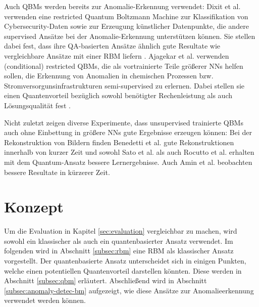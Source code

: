 Auch QBMs werden bereits zur Anomalie-Erkennung verwendet: Dixit et al. \cite{dixit2021training} verwenden eine restricted Quantum Boltzmann Machine zur Klassifikation von Cybersecurity-Daten sowie zur Erzeugung künstlicher Datenpunkte, die andere supervised Ansätze bei der Anomalie-Erkennung unterstützen können. Sie stellen dabei fest, dass ihre QA-basierten Ansätze ähnlich gute Resultate wie vergleichbare Ansätze mit einer RBM liefern \cite{dixit2021training}. Ajagekar et al. \cite{ajagekar2020quantum, ajagekar2021quantum} verwenden (conditional) restricted QBMs, die als vortrainierte Teile größerer NNs helfen sollen, die Erkennung von Anomalien in chemischen Prozessen \cite{ajagekar2020quantum} bzw. Stromversorgunsinfrastrukturen \cite{ajagekar2021quantum} semi-supervised zu erlernen. Dabei stellen sie einen Quantenvorteil bezüglich sowohl benötigter Rechenleistung als auch Lösungsqualität fest \cite{ajagekar2021quantum}.

Nicht zuletzt zeigen diverse Experimente, dass unsupervised trainierte QBMs auch ohne Einbettung in größere NNs gute Ergebnisse erzeugen können: Bei der Rekonstruktion von Bildern finden Benedetti et al. \cite{Benedetti17} gute Rekonstruktionen innerhalb von kurzer Zeit und sowohl Sato et al. \cite{sato2021assessment} als auch Rocutto et al. \cite{rocutto2021quantum} erhalten mit dem Quantum-Ansatz bessere Lernergebnisse. Auch Amin et al. \cite{Amin18} beobachten bessere Resultate in kürzerer Zeit.


\section{Konzept}
\label{sec:concept}
Um die Evaluation in Kapitel \ref{sec:evaluation} vergleichbar zu machen, wird sowohl ein klassischer als auch ein quantenbasierter Ansatz verwendet. Im folgenden wird in Abschnitt \ref{subsec:rbm} eine RBM als klassischer Ansatz vorgestellt. Der quantenbasierte Ansatz unterscheidet sich in einigen Punkten, welche einen potentiellen Quantenvorteil darstellen könnten. Diese werden in Abschnitt \ref{subsec:qbm} erläutert. Abschließend wird in Abschnitt \ref{subsec:anomaly-detec-bm} aufgezeigt, wie diese Ansätze zur Anomalieerkennung verwendet werden können. 

